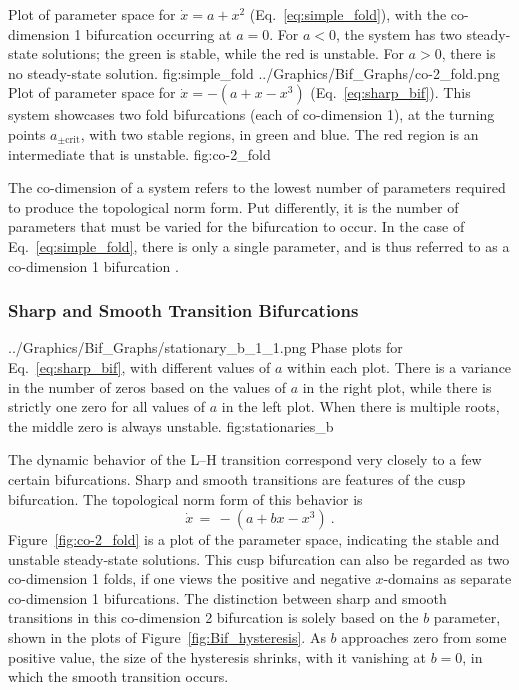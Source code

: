 	{Plot of parameter space for $\dot{x} = a + x^2$ (Eq.~\ref{eq:simple_fold}), with the co-dimension 1 bifurcation occurring at $a = 0$. %
	For $a < 0$, the system has two steady-state solutions; the green is stable, while the red is unstable.
	For $a > 0$, there is no steady-state solution.}
	{fig:simple_fold}
	{../Graphics/Bif_Graphs/co-2_fold.png}
	{Plot of parameter space for $\dot{x} = -(a + x - x^3)$ (Eq.~\ref{eq:sharp_bif}). %
	This system showcases two fold bifurcations (each of co-dimension 1), at the turning points $a_{\pm\text{crit}}$, with two stable regions, in green and blue. %
	The red region is an intermediate that is unstable.}
	{fig:co-2_fold}

The co-dimension of a system refers to the lowest number of parameters required to produce the topological norm form.
Put differently, it is the number of parameters that must be varied for the bifurcation to occur.
In the case of Eq.~\ref{eq:simple_fold}, there is only a single parameter, and is thus referred to as a co-dimension 1 bifurcation \cite{weymiens_bifurcation_2014}.

\subsubsection{Sharp and Smooth Transition Bifurcations}
	{../Graphics/Bif_Graphs/stationary_b_1_1.png}
	{Phase plots for Eq.~\ref{eq:sharp_bif}, with different values of $a$ within each plot. %
	There is a variance in the number of zeros based on the values of $a$ in the right plot, while there is strictly one zero for all values of $a$ in the left plot. %
	When there is multiple roots, the middle zero is always unstable.}
	{fig:stationaries_b}

The dynamic behavior of the L--H transition correspond very closely to a few certain bifurcations.
Sharp and smooth transitions are features of the cusp bifurcation.
The topological norm form of this behavior is
\begin{equation}
	\dot{x} \,=\, -(a + bx - x^3)~.
	\label{eq:sharp_bif}
\end{equation}
Figure~\ref{fig:co-2_fold} is a plot of the parameter space, indicating the stable and unstable steady-state solutions.
This cusp bifurcation can also be regarded as two co-dimension 1 folds, if one views the positive and negative $x$-domains as separate co-dimension 1 bifurcations.
The distinction between sharp and smooth transitions in this co-dimension 2 bifurcation is solely based on the $b$ parameter, shown in the plots of Figure~\ref{fig:Bif_hysteresis}.
As $b$ approaches zero from some positive value, the size of the hysteresis shrinks, with it vanishing at $b = 0$, in which the smooth transition occurs.

